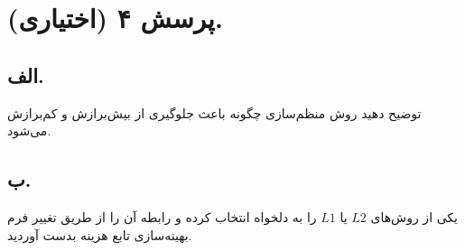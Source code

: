 \section{پرسش ۴ (اختیاری).}

\subsection*{الف.}
توضیح دهید روش منظم‌سازی چگونه باعث جلوگیری از بیش‌برازش و کم‌برازش می‌شود.

\subsection*{ب.}
یکی از روش‌های $L2$ یا $L1$  را به دلخواه انتخاب کرده و رابطه آن را از طریق تغییر فرم بهینه‌سازی تابع هزینه بدست آوردید.